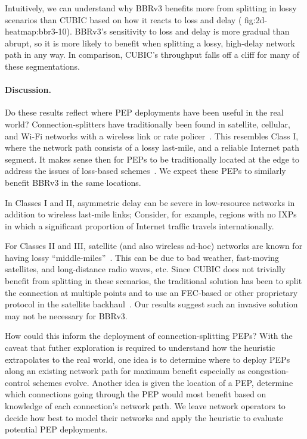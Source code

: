 Intuitively, we can understand why BBRv3 benefits more from splitting in lossy
scenarios than CUBIC based on how it reacts to loss and delay (\Cref
{fig:2d-heatmap:bbr3-10}). BBRv3's sensitivity to loss
and delay is more gradual than abrupt, so it is more likely to benefit when
splitting a lossy, high-delay network path in any way. In comparison, CUBIC's
throughput falls off a cliff for many of these segmentations.

\paragraph{Discussion.}
Do these results reflect where PEP deployments have been useful in the real
world? Connection-splitters have traditionally been found in satellite,
cellular, and Wi-Fi networks with a wireless link or rate policer~\cite
{edeline2019bottomup,honda2011still}. This resembles Class I, where the
network path consists of a lossy last-mile, and a reliable Internet path
segment. It makes sense then for PEPs to be traditionally located at the edge
to address the issues of loss-based schemes~\cite
{cloudsplitting2010,rfc3135,farkas2012splittcp}. We expect these PEPs to
similarly benefit BBRv3 in the same locations.

In Classes I and II, asymmetric delay can be severe in low-resource networks
in addition to wireless last-mile links;
Consider, for example, regions with no IXPs in which a significant proportion
of Internet traffic travels internationally.

For Classes II and III, satellite (and also wireless ad-hoc)
networks are known for
having lossy ``middle-miles''~\cite{kuhn2021quic-over-sat,border2020evaluating,pirovano2013new,cloudsplitting2010}.
This can be due to bad weather, fast-moving satellites, and
long-distance radio waves, etc.
Since CUBIC does not trivially benefit from splitting in these scenarios, the
traditional solution has been to split the connection at multiple points and to
use an FEC-based or other proprietary protocol in the satellite backhaul~\cite
{cloudsplitting2010,border2020evaluating,rfc3135}.
Our results suggest such an invasive solution may not be necessary for BBRv3.

How could this inform the deployment of connection-splitting PEPs?
With the caveat that futher exploration is required to understand how the
heuristic extrapolates to the real world, one idea is to
determine where to deploy PEPs along an existing network path for maximum
benefit especially as congestion-control schemes evolve.
Another idea is given the location of a PEP, determine which connections going
through the PEP would most benefit based on knowledge of each connection's
network path.
We leave network operators to decide how best to model their networks and apply
the heuristic to evaluate potential PEP deployments.

